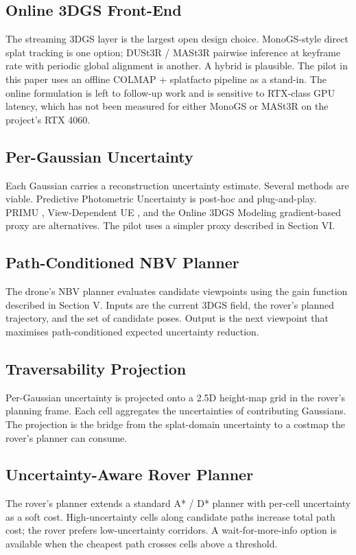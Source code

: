 \documentclass[conference]{IEEEtran}
\begin{document}
\subsection{Online 3DGS Front-End}
The streaming 3DGS layer is the largest open design choice. MonoGS-style direct splat tracking is one option; DUSt3R / MASt3R pairwise inference at keyframe rate with periodic global alignment is another. A hybrid is plausible. The pilot in this paper uses an offline COLMAP + splatfacto pipeline as a stand-in. The online formulation is left to follow-up work and is sensitive to RTX-class GPU latency, which has not been measured for either MonoGS or MASt3R on the project's RTX 4060.

\subsection{Per-Gaussian Uncertainty}
Each Gaussian carries a reconstruction uncertainty estimate. Several methods are viable. Predictive Photometric Uncertainty \cite{predphoto} is post-hoc and plug-and-play. PRIMU \cite{primu}, View-Dependent UE \cite{viewdep}, and the Online 3DGS Modeling gradient-based proxy \cite{online3dgs} are alternatives. The pilot uses a simpler proxy described in Section VI.

\subsection{Path-Conditioned NBV Planner}
The drone's NBV planner evaluates candidate viewpoints using the gain function described in Section V. Inputs are the current 3DGS field, the rover's planned trajectory, and the set of candidate poses. Output is the next viewpoint that maximises path-conditioned expected uncertainty reduction.

\subsection{Traversability Projection}
Per-Gaussian uncertainty is projected onto a 2.5D height-map grid in the rover's planning frame. Each cell aggregates the uncertainties of contributing Gaussians. The projection is the bridge from the splat-domain uncertainty to a costmap the rover's planner can consume.

\subsection{Uncertainty-Aware Rover Planner}
The rover's planner extends a standard A* / D* planner with per-cell uncertainty as a soft cost. High-uncertainty cells along candidate paths increase total path cost; the rover prefers low-uncertainty corridors. A wait-for-more-info option is available when the cheapest path crosses cells above a threshold.
\end{document}
